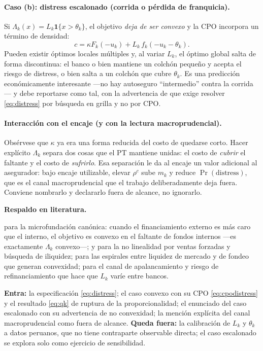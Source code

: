 \documentclass[11pt]{article}
\newcommand{\lit}{\par\noindent\textbf{Respaldo en literatura.}\par}
\theoremstyle{definition}
\begin{document}
\paragraph{Caso (b): distress escalonado (corrida o p\'erdida de franquicia).} Si
$\Lambda_k(x)=L_k\mathbf{1}\{x>\theta_k\}$, el objetivo \emph{deja de ser convexo}
y la CPO incorpora un t\'ermino de densidad:
\begin{equation}
c=\kappa F_k(-u_k)+L_k\,f_k(-u_k-\theta_k).
\label{eq:cpoescalon}
\end{equation}
Pueden existir \'optimos locales m\'ultiples y, al variar $L_k$, el \'optimo global
salta de forma discontinua: el banco o bien mantiene un colch\'on peque\~no y
acepta el riesgo de distress, o bien salta a un colch\'on que cubre $\theta_k$. Es
una predicci\'on econ\'omicamente interesante ---no hay autoseguro ``intermedio''
contra la corrida--- y debe reportarse como tal, con la advertencia de que exige
resolver \eqref{eq:distress} por b\'usqueda en grilla y no por CPO.

\paragraph{Interacci\'on con el encaje (y con la lectura macroprudencial).}
Obs\'ervese que $\kappa$ ya era una forma reducida del costo de quedarse corto.
Hacer expl\'icito $\Lambda_k$ separa dos cosas que el PT mantiene unidas: el costo
de \emph{cubrir} el faltante y el costo de \emph{sufrirlo}. Esa separaci\'on le da
al encaje un valor adicional al asegurador: bajo encaje utilizable, elevar
$\rho^c$ sube $m_k$ y reduce $\Pr(\text{distress})$, que es el canal
macroprudencial que el trabajo deliberadamente deja fuera. Conviene nombrarlo y
declararlo fuera de alcance, no ignorarlo.

\lit
\citet{froot1993} para la microfundaci\'on can\'onica: cuando el financiamiento
externo es m\'as caro que el interno, el objetivo es convexo en el faltante de
fondos internos ---es exactamente $\Lambda_k$ convexo---;
\citet{shleifervishny2011} y \citet{diamondrajan2011} para la no linealidad por
ventas forzadas y b\'usqueda de iliquidez;
\citet{brunnermeierpedersen2009} para las espirales entre liquidez de mercado y de
fondeo que generan convexidad;
\citet{acharyaskeie2011} para el canal de apalancamiento y riesgo de
refinanciamiento que hace que $L_k$ var\'ie entre bancos.

\begin{ie2}
\textbf{Entra:} la especificaci\'on \eqref{eq:distress}; el caso convexo con su
CPO \eqref{eq:cpodistress} y el resultado \eqref{eq:qk} de ruptura de la
proporcionalidad; el enunciado del caso escalonado con su advertencia de no
convexidad; la menci\'on expl\'icita del canal macroprudencial como fuera de
alcance.
\textbf{Queda fuera:} la calibraci\'on de $L_k$ y $\theta_k$ a datos peruanos, que
no tiene contraparte observable directa; el caso escalonado se explora solo como
ejercicio de sensibilidad.
\end{ie2}
\end{document}
